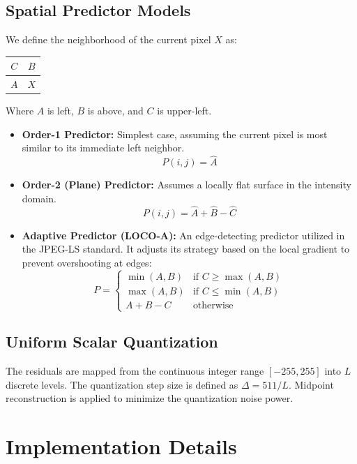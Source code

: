 \documentclass[12pt,a4paper]{article}
\begin{document}
\subsection{Spatial Predictor Models}

We define the neighborhood of the current pixel $X$ as:
\begin{center}
\begin{tabular}{|c|c|}
\hline
$C$ & $B$ \\ \hline
$A$ & $X$ \\ \hline
\end{tabular}
\end{center}
Where $A$ is left, $B$ is above, and $C$ is upper-left.

\begin{itemize}
    \item \textbf{Order-1 Predictor:} Simplest case, assuming the current pixel is most similar to its immediate left neighbor.
    \[ P(i,j) = \hat{A} \]
    
    \item \textbf{Order-2 (Plane) Predictor:} Assumes a locally flat surface in the intensity domain.
    \[ P(i,j) = \hat{A} + \hat{B} - \hat{C} \]
    
    \item \textbf{Adaptive Predictor (LOCO-A):} An edge-detecting predictor utilized in the JPEG-LS standard. It adjusts its strategy based on the local gradient to prevent overshooting at edges:
    \[
    P = \begin{cases}
    \min(A,B) & \text{if } C \geq \max(A,B) \\
    \max(A,B) & \text{if } C \leq \min(A,B) \\
    A+B-C & \text{otherwise}
    \end{cases}
    \]
\end{itemize}

\subsection{Uniform Scalar Quantization}

The residuals are mapped from the continuous integer range $[-255, 255]$ into $L$ discrete levels. The quantization step size is defined as $\Delta = 511/L$. Midpoint reconstruction is applied to minimize the quantization noise power.

\newpage

\section{Implementation Details}
\end{document}
